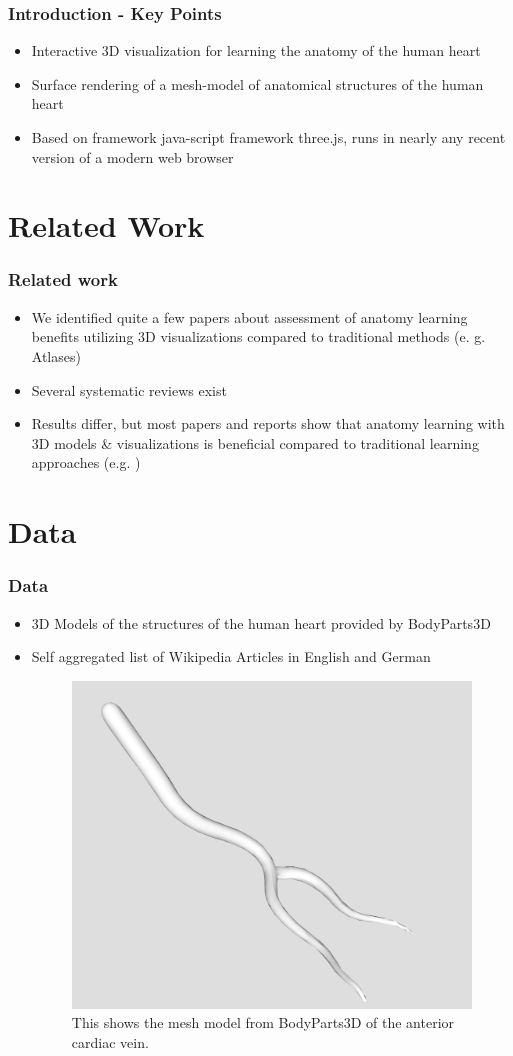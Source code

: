 \documentclass{beamer}
\begin{document}
\begin{frame}
\frametitle{Introduction - Key Points}
\begin{itemize}
    \item Interactive 3D visualization for learning the anatomy of the human heart
    \item Surface rendering of a mesh-model of anatomical structures of the human heart
    \item Based on framework java-script framework three.js, runs in nearly any recent version of a modern web browser
\end{itemize}
\end{frame}

\section{Related Work} 
\begin{frame}
\frametitle{Related work}
\begin{itemize}
\item We identified quite a few papers about assessment of anatomy learning benefits utilizing 3D visualizations compared to traditional methods (e. g. Atlases)
\item Several systematic reviews exist
\item Results differ, but most papers and reports show that anatomy learning with 3D models \& visualizations is beneficial compared to traditional learning approaches (e.g. \cite{p3} \cite{p4} )
\end{itemize}
\end{frame}

\section{Data} 
\begin{frame}
\frametitle{Data}
\begin{itemize}
\item 3D Models of the structures of the human heart provided by BodyParts3D \cite{p1}


\item Self aggregated list of Wikipedia Articles in English and German

\begin{figure}[h]
  \centering
  \includegraphics[width=0.4\linewidth]{../../screenshots/images/anterior_cardiac_vein.png}
  \caption{This shows the mesh model from BodyParts3D of the anterior cardiac vein.}
\end{figure}
\end{itemize}
  

\end{frame}
\end{document}

